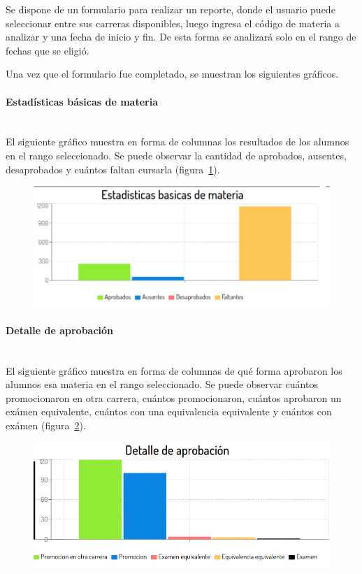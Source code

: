 Se dispone de un formulario para realizar un reporte, donde el usuario puede seleccionar entre sus carreras disponibles, luego ingresa el código de materia a analizar y una fecha de inicio y fin. De esta forma se analizará solo en el rango de fechas que se eligió.

Una vez que el formulario fue completado, se muestran los siguientes gráficos.

\paragraph{Estadísticas básicas de materia} \mbox{}\\
El siguiente gráfico muestra en forma de columnas los resultados de los alumnos en el rango seleccionado. Se puede observar la cantidad de aprobados, ausentes, desaprobados y cuántos faltan cursarla  (figura~\ref{fig:sa-datos-basico}).

\begin{figure}[H]
  \centering
    \includegraphics[scale=0.4]{images/seguimiento-academico/sa-datosbasicos.png}
  \label{fig:sa-datos-basico}
\end{figure}

\paragraph{Detalle de aprobación} \mbox{}\\
El siguiente gráfico muestra en forma de columnas de qué forma aprobaron los alumnos esa materia en el rango seleccionado. Se puede observar cuántos promocionaron en otra carrera, cuántos promocionaron, cuántos aprobaron un exámen equivalente, cuántos con una equivalencia equivalente y cuántos con exámen  (figura~\ref{fig:sa-detalle-aprobacion}).

\begin{figure}[H]
  \centering
    \includegraphics[scale=0.4]{images/seguimiento-academico/sa-detalleaprobacion.png}
  \label{fig:sa-detalle-aprobacion}
\end{figure}

